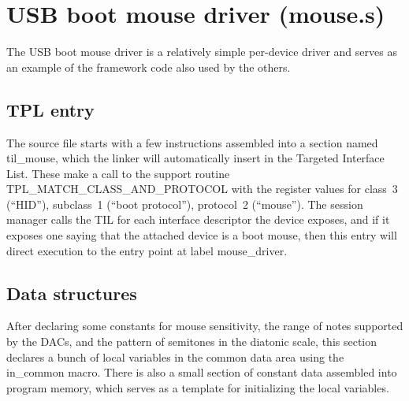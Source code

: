 
%
%
%
%
%
%

\chapter{USB boot mouse driver (mouse.s)}

The USB boot mouse driver is a relatively simple per-device driver and
serves as an example of the framework code also used by the others.

\section{TPL entry}

The source file starts with a few instructions assembled into a section
named til\_mouse, which the linker will automatically insert in the Targeted
Interface List.  These make a call to the support routine
TPL\_MATCH\_CLASS\_AND\_PROTOCOL with the register values for class~3
(``HID''), subclass~1 (``boot protocol''), protocol~2 (``mouse'').  The
session manager calls the TIL for each interface descriptor the device
exposes, and if it exposes one saying that the attached device is a boot
mouse, then this entry will direct execution to the entry point at label
mouse\_driver.

\section{Data structures}

After declaring some constants for mouse sensitivity, the range of notes
supported by the DACs, and the pattern of semitones in the diatonic scale,
this section declares a bunch of local variables in the common data area
using the in\_common macro.  There is also a small section of constant data
assembled into program memory, which serves as a template for initializing
the local variables.

